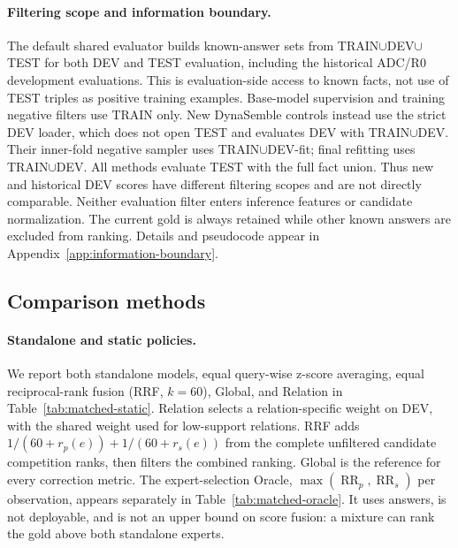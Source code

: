 \documentclass[11pt,a4paper]{article}
\newcommand{\RR}{\operatorname{RR}}
\begin{document}
\paragraph{Filtering scope and information boundary.}
The default shared evaluator builds known-answer sets from TRAIN$\cup$DEV$\cup$TEST for both DEV and TEST evaluation, including the historical ADC/R0 development evaluations. This is evaluation-side access to known facts, not use of TEST triples as positive training examples. Base-model supervision and training negative filters use TRAIN only. New DynaSemble controls instead use the strict DEV loader, which does not open TEST and evaluates DEV with TRAIN$\cup$DEV. Their inner-fold negative sampler uses TRAIN$\cup$DEV-fit; final refitting uses TRAIN$\cup$DEV. All methods evaluate TEST with the full fact union. Thus new and historical DEV scores have different filtering scopes and are not directly comparable. Neither evaluation filter enters inference features or candidate normalization. The current gold is always retained while other known answers are excluded from ranking. Details and pseudocode appear in Appendix~\ref{app:information-boundary}.

\subsection{Comparison methods}
\paragraph{Standalone and static policies.}
We report both standalone models, equal query-wise z-score averaging, equal reciprocal-rank fusion (RRF, $k=60$), Global, and Relation in Table~\ref{tab:matched-static}. Relation selects a relation-specific weight on DEV, with the shared weight used for low-support relations. RRF adds $1/(60+r_p(e))+1/(60+r_s(e))$ from the complete unfiltered candidate competition ranks, then filters the combined ranking. Global is the reference for every correction metric. The expert-selection Oracle, $\max(\RR_p,\RR_s)$ per observation, appears separately in Table~\ref{tab:matched-oracle}. It uses answers, is not deployable, and is not an upper bound on score fusion: a mixture can rank the gold above both standalone experts.
\end{document}
